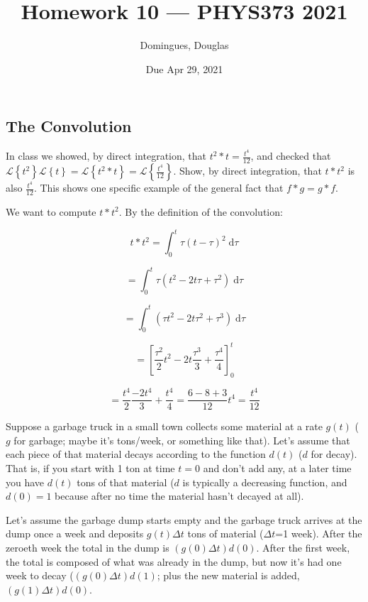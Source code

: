 \documentclass[answers]{exam}\newcommand{\repositoryInformationSetup}{     \usepackage[dvipsnames]{xcolor}     \usepackage[ angle=90, color=black, opacity=1, scale=2, ]{background}      \SetBgPosition{current page.west}      \SetBgVshift{-4.5mm}      \backgroundsetup{contents={{\color{green}\texttt{-{}-} differs from commit \texttt{40a9b87} in 0 files}}} } \newcommand{\commit}{{{\color{green}40a9b87}}}\usepackage{amsmath}
\newcommand{\laplace}[1]{\ensuremath{\mathcal{L}\left\{#1\right\}}\xspace}
\providecommand{\id}{}
\renewcommand{\id}[1]{\ensuremath{\; \mathrm{d}#1}}
\begin{document}
\title{Homework 10 --- PHYS373 2021}

\author{Domingues, Douglas}

\date{Due Apr 29, 2021}

\maketitle

\begin{questions}
	\section*{The Convolution}
	\question In class we showed, by direct integration, that $t^2*t = \frac{t^4}{12}$, and checked that $\laplace{t^2}\laplace{t} = \laplace{t^2*t} = \laplace{\frac{t^4}{12}}$.
Show, by direct integration, that $t*t^2$ is also $\frac{t^4}{12}$.
This shows one specific example of the general fact that $f*g = g*f$.

\begin{solution}
We want to compute $t \ast t^2$. By the definition of the convolution:

$$t \ast t^2 = \int_0^t \tau (t-\tau)^2 \id{\tau}$$

$$ = \int_0^t \tau (t^2 -2 t \tau + \tau ^2) \id{\tau}$$

$$ = \int_0^t  (\tau t^2 -2 t \tau^2 + \tau ^3) \id{\tau}$$

$$ = [\frac{\tau^2}{2} t^2 -2 t \frac{\tau^3}{3} + \frac{\tau ^4}{4}]_0^t$$

$$ = \frac{t^4}{2} \frac{-2 t^4}{3} + \frac{t^4}{4} = \frac{6 - 8 + 3}{12} t^4 = \frac{t^4}{12}$$

\end{solution}


 	\question Suppose a garbage truck in a small town collects some material at a rate $g(t)$ ($g$ for garbage; maybe it's tons/week, or something like that).
Let's assume that each piece of that material decays according to the function $d(t)$ ($d$ for decay).
That is, if you start with 1 ton at time $t=0$ and don't add any, at a later time you have $d(t)$ tons of that material ($d$ is typically a decreasing function, and $d(0)=1$ because after no time the material hasn't decayed at all).

Let's assume the garbage dump starts empty and the garbage truck arrives at the dump once a week and deposits $g(t) \Delta t$ tons of material ($\Delta t$=1 week).  
After the zeroeth week the total in the dump is $(g(0) \Delta t) d(0)$.
After the first week, the total is composed of what was already in the dump, but now it's had one week to decay ($(g(0) \Delta t) d(1)$; plus the new material is added, $(g(1) \Delta t) d(0)$.


\end{questions}
\end{document}
